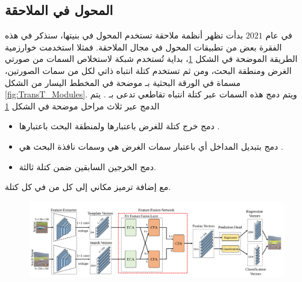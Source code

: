 \subsection{المحول في الملاحقة}
في عام 
$2021$
بدأت تظهر أنظمة ملاحقة تستخدم المحول في بنيتها، سنذكر في هذه الفقرة بعض من تطبيقات المحول في مجال الملاحقة.
\newline
فمثلا استخدمت خوارزمية 
الطريقة الموضحة في الشكل 
\ref{fig:TransT}،
بداية تُستخدم شبكة 
لاستخلاص السمات من صورتي الغرض ومنطقة البحث، ومن ثم تستخدم كتلة انتباه ذاتي لكل من سمات الصورتين، مسماة في الورقة البحثية بـ
موضحة في المخطط اليسار من الشكل 
\ref{fig:TransT_Modules}.
ويتم دمج هذه السمات عبر كتلة انتباه تقاطعي تدعى بـ
.
يتم الدمج عبر ثلاث مراحل موضحة في الشكل 
\ref{fig:TransT}
\begin{itemize}
	\item
	دمج خرج كتلة 
	للغرض باعتبارها 
	 ولمنطقة البحث باعتبارها
 	.
 	\item
 	دمج بتبديل المداخل أي باعتبار سمات الغرض هي 
 	وسمات نافذة البحث هي 
	.
 	\item
 	دمج الخرجين السابقين ضمن كتلة 
	ثالثة.
\end{itemize}
مع إضافة ترميز مكاني إلى كل من 
في كل كتلة.
\newline

\begin{figure}[!h]
	\centerline{\includegraphics[width=\textwidth]{images/TransT}}
	\caption{
		}
	\label{fig:TransT}
\end{figure}

